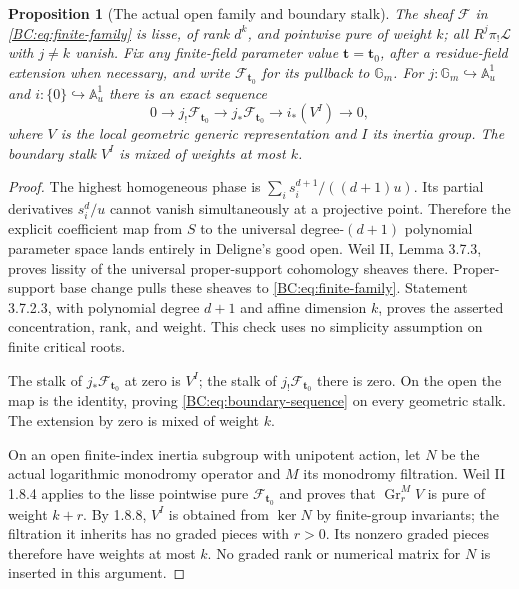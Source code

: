 \documentclass[11pt,a4paper]{article}
\newtheorem{proposition}[theorem]{Proposition}
\newcommand{\A}{\mathbb A}
\newcommand{\Gm}{{\mathbb G_m}}
\begin{document}
\begin{proposition}[The actual open family and boundary stalk]
The sheaf $\mathcal F$ in \eqref{BC:eq:finite-family} is lisse, of rank
$d^k$, and pointwise pure of weight $k$; all $R^j\pi_!\mathcal L$ with
$j\ne k$ vanish.  Fix any finite-field parameter value
$\mathbf t=\mathbf t_0$, after a residue-field extension when necessary,
and write $\mathcal F_{\mathbf t_0}$ for its pullback to $\Gm$.
For $j:\Gm\hookrightarrow\A^1_u$ and $i:\{0\}\hookrightarrow\A^1_u$
there is an exact sequence
\begin{equation}
 0\longrightarrow j_!\mathcal F_{\mathbf t_0}
  \longrightarrow j_*\mathcal F_{\mathbf t_0}
  \longrightarrow i_*(V^I)\longrightarrow0,                \label{BC:eq:boundary-sequence}
\end{equation}
where $V$ is the local geometric generic representation and $I$ its
inertia group.  The boundary stalk $V^I$ is mixed of weights at most $k$.
\end{proposition}
\begin{proof}
The highest homogeneous phase is
$\sum_i s_i^{d+1}/((d+1)u)$.  Its partial derivatives $s_i^d/u$
cannot vanish simultaneously at a projective point.  Therefore the
explicit coefficient map from $S$ to the universal degree-$(d+1)$
polynomial parameter space lands entirely in Deligne's good open.
Weil II, Lemma 3.7.3, proves lissity of the universal proper-support
cohomology sheaves there.  Proper-support base change pulls these sheaves
to \eqref{BC:eq:finite-family}.  Statement 3.7.2.3, with polynomial degree
$d+1$ and affine dimension $k$, proves the asserted concentration, rank,
and weight.  This check uses no simplicity assumption on finite critical
roots.

The stalk of $j_*\mathcal F_{\mathbf t_0}$ at zero is $V^I$; the stalk
of $j_!\mathcal F_{\mathbf t_0}$ there is zero.  On the open the map is
the identity, proving \eqref{BC:eq:boundary-sequence} on every geometric
stalk.  The extension by zero is mixed of weight $k$.

On an open finite-index inertia subgroup with unipotent action, let $N$
be the actual logarithmic monodromy operator and $M$ its monodromy
filtration.  Weil II 1.8.4 applies to the lisse pointwise pure
$\mathcal F_{\mathbf t_0}$ and proves that
$\operatorname{Gr}_r^M V$ is pure of weight $k+r$.
By 1.8.8, $V^I$ is obtained from $\ker N$ by finite-group invariants;
the filtration it inherits has no graded pieces with $r>0$.
Its nonzero graded pieces therefore have weights at most $k$.
No graded rank or numerical matrix for $N$ is inserted in this argument.
\end{proof}
\end{document}
